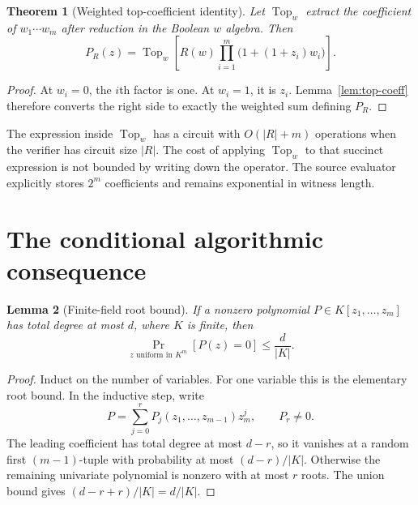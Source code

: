 \documentclass[11pt,letterpaper,oneside]{report}
\theoremstyle{komorebi}
\newtheorem{theorem}{Theorem}[chapter]
\newtheorem{lemma}[theorem]{Lemma}
\newcommand{\KTop}{\operatorname{Top}}
\begin{document}
\begin{theorem}[Weighted top-coefficient identity]\label{thm:weighted-top}
Let $\KTop_w$ extract the coefficient of $w_1\cdots w_m$ after reduction in the Boolean $w$ algebra. Then
\begin{equation}\label{eq:weighted-top}
 P_R(z)=\KTop_w\left[
 R(w)\prod_{i=1}^m\bigl(1+(1+z_i)w_i\bigr)
 \right].
\end{equation}
\end{theorem}
\begin{proof}
At $w_i=0$, the $i$th factor is one. At $w_i=1$, it is $z_i$. Lemma~\ref{lem:top-coeff} therefore converts the right side to exactly the weighted sum defining $P_R$.
\end{proof}

The expression inside $\KTop_w$ has a circuit with $O(|R|+m)$ operations when the verifier has circuit size $|R|$. The cost of applying $\KTop_w$ to that succinct expression is not bounded by writing down the operator. The source evaluator explicitly stores $2^m$ coefficients and remains exponential in witness length.

\section{The conditional algorithmic consequence}
\begin{lemma}[Finite-field root bound]\label{lem:roots}
If a nonzero polynomial $P\in K[z_1,\ldots,z_m]$ has total degree at most $d$, where $K$ is finite, then
\[
 \Pr_{z\text{ uniform in }K^m}[P(z)=0]\le\frac d{|K|}.
\]
\end{lemma}
\begin{proof}
Induct on the number of variables. For one variable this is the elementary root bound. In the inductive step, write
\[
 P=\sum_{j=0}^r P_j(z_1,\ldots,z_{m-1})z_m^j,
 \qquad P_r\ne0.
\]
The leading coefficient has total degree at most $d-r$, so it vanishes at a random first $(m-1)$-tuple with probability at most $(d-r)/|K|$. Otherwise the remaining univariate polynomial is nonzero with at most $r$ roots. The union bound gives $(d-r+r)/|K|=d/|K|$.
\end{proof}
\end{document}
